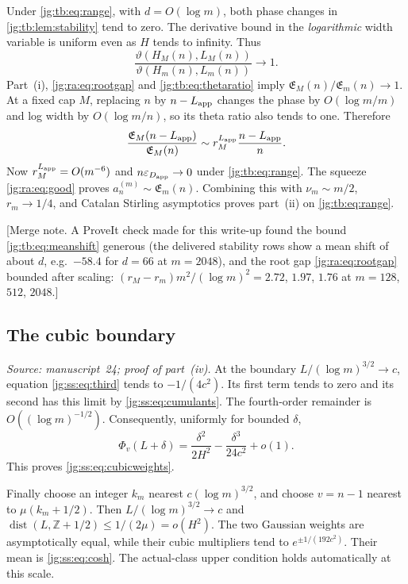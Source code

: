 \documentclass[11pt,a4paper]{article}
\theoremstyle{definition}\newaliascnt{definition}{theorem}
\theoremstyle{remark}\newaliascnt{remark}{theorem}
\newcommand{\eps}{\varepsilon}
\begin{document}
Under \eqref{jg:tb:eq:range}, with $d=O(\log m)$, both phase changes in
\cref{jg:tb:lem:stability} tend to zero. The derivative bound in the
\emph{logarithmic} width variable is uniform even as $H$ tends to infinity. Thus
\begin{equation}\label{jg:tb:eq:thetaratio}
 \frac{\vartheta(H_M(n),L_M(n))}
      {\vartheta(H_m(n),L_m(n))}\longrightarrow1.
\end{equation}
Part~(i), \eqref{jg:ra:eq:rootgap} and \eqref{jg:tb:eq:thetaratio} imply
$\mathfrak E_M(n)/\mathfrak E_m(n)\to1$. At a fixed cap $M$, replacing $n$ by
$n-L_{\rm app}$ changes the phase by $O(\log m/m)$ and log width by
$O(\log m/n)$, so its theta ratio also tends to one. Therefore
\[
 \frac{\mathfrak E_M(n-L_{\rm app})}{\mathfrak E_M(n)}
 \sim r_M^{L_{\rm app}}\frac{n-L_{\rm app}}n.
\]
Now $r_M^{L_{\rm app}}=O(m^{-6})$ and $n\eps_{D_{\rm app}}\to0$ under
\eqref{jg:tb:eq:range}. The squeeze \eqref{jg:ra:eq:good} proves
$a_n^{(m)}\sim\mathfrak E_m(n)$. Combining this with $\nu_m\sim m/2$,
$r_m\to1/4$, and Catalan Stirling asymptotics proves part~(ii) on
\eqref{jg:tb:eq:range}.

[Merge note. A ProveIt check made for this write-up found the bound
\eqref{jg:tb:eq:meanshift} generous (the delivered stability rows show a mean
shift of about $d$, e.g.\ $-58.4$ for $d=66$ at $m=2048$), and the root gap
\eqref{jg:ra:eq:rootgap} bounded after scaling:
$(r_M-r_m)m^2/(\log m)^2=2.72$, $1.97$, $1.76$ at $m=128$, $512$, $2048$.]

\subsection{The cubic boundary}
\label{jg:sec:cubic}
\emph{Source: manuscript~24; proof of part~(iv).} At the boundary
$L/(\log m)^{3/2}\to c$, equation \eqref{jg:ss:eq:third} tends to
$-1/(4c^2)$. Its first term tends to zero and its second has this limit by
\eqref{jg:ss:eq:cumulants}. The fourth-order remainder is
$O((\log m)^{-1/2})$. Consequently, uniformly for bounded $\delta$,
\[
 \Phi_v(L+\delta)=\frac{\delta^2}{2H^2}
                  -\frac{\delta^3}{24c^2}+o(1).
\]
This proves \eqref{jg:ss:eq:cubicweights}.

Finally choose an integer $k_m$ nearest $c(\log m)^{3/2}$, and choose $v=n-1$
nearest to $\mu(k_m+1/2)$. Then $L/(\log m)^{3/2}\to c$ and
$\operatorname{dist}(L,\mathbb Z+1/2)\le1/(2\mu)=o(H^2)$. The two Gaussian
weights are asymptotically equal, while their cubic multipliers tend to
$e^{\pm1/(192c^2)}$. Their mean is \eqref{jg:ss:eq:cosh}. The actual-class upper
condition holds automatically at this scale.
\end{document}
